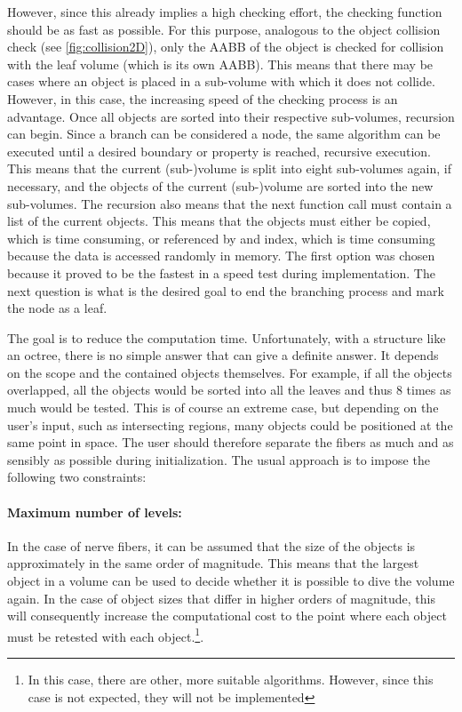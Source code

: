 However, since this already implies a high checking effort, the checking function should be as fast as possible.
For this purpose, analogous to the object collision check (see \cref{fig:collision2D}), only the \ac{AABB} of the object is checked for collision with the leaf volume (which is its own \ac{AABB}).
This means that there may be cases where an object is placed in a sub-volume with which it does not collide.
However, in this case, the increasing speed of the checking process is an advantage.
Once all objects are sorted into their respective sub-volumes, recursion can begin.
Since a branch can be considered a node, the same algorithm can be executed until a desired boundary or property is reached, \ie{} recursive execution.
This means that the current (sub-)volume is split into eight sub-volumes again, if necessary, and the objects of the current (sub-)volume are sorted into the new sub-volumes.
The recursion also means that the next function call must contain a list of the current objects.
This means that the objects must either be copied, which is time consuming, or referenced by \eg{} and index, which is time consuming because the data is accessed randomly in memory.
The first option was chosen because it proved to be the fastest in a speed test during implementation.
The next question is what is the desired goal to end the branching process and mark the node as a leaf.
\par
%
The goal is to reduce the computation time.
Unfortunately, with a structure like an octree, there is no simple answer that can give a definite answer.
It depends on the scope and the contained objects themselves.
For example, if all the objects overlapped, all the objects would be sorted into all the leaves and thus 8 times as much would be tested.
This is of course an extreme case, but depending on the user's input, such as intersecting regions, many objects could be positioned at the same point in space.
The user should therefore separate the fibers as much and as sensibly as possible during initialization.
The usual approach is to impose the following two constraints:
%
\paragraph{Maximum number of levels:}
In the case of nerve fibers, it can be assumed that the size of the objects is approximately in the same order of magnitude.
This means that the largest object in a volume can be used to decide whether it is possible to dive the volume again.
In the case of object sizes that differ in higher orders of magnitude, this will consequently increase the computational cost to the point where each object must be retested with each object.\footnote{In this case, there are other, more suitable algorithms. However, since this case is not expected, they will not be implemented}.
%
